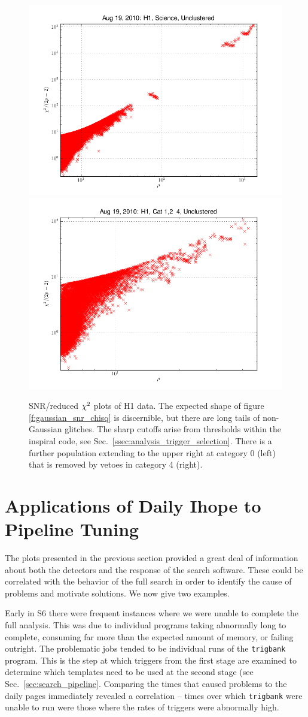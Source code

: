 \begin{figure}
  \includegraphics[width=0.5\linewidth]{figures/detchar/H1_0_UNCLUSTERED_chisq.png}
  \includegraphics[width=0.5\linewidth]{figures/detchar/H1_4_UNCLUSTERED_chisq.png}
  \caption[SNR/reduced $\chisq$ plots of H1 data.]{
  \label{f:daily_ihope_snr_chisq}
SNR/reduced $\chisq$ plots of H1 data.  The expected shape of figure
\ref{f:gaussian_snr_chisq} is discernible, but there are long tails of
non-Gaussian glitches.  The sharp cutoffs arise from thresholds within
the inspiral code, see Sec.~\ref{ssec:analysis_trigger_selection}.
There is a further population extending to the upper right at category
0 (left) that is removed by vetoes in category 4 (right).}
\end{figure}%


\section{Applications of Daily Ihope to Pipeline Tuning}
\label{sec:applications_pipeline}


The plots presented in the previous section provided a great deal of
information about both the detectors and the response of the search
software.  These could be correlated with the behavior of the full
search in order to identify the cause of problems and motivate
solutions.  We now give two examples.

Early in S6 there were frequent instances where we were unable to
complete the full analysis.  This was due to individual programs
taking abnormally long to complete, consuming far more than the
expected amount of memory, or failing outright.  The problematic jobs
tended to be individual runs of the \texttt{trigbank} program.  This
is the step at which triggers from the first stage are examined to
determine which templates need to be used at the second stage (see
Sec.~\ref{sec:search_pipeline}.  Comparing the times that caused
problems to the daily pages immediately revealed a correlation --
times over which \texttt{trigbank} were unable to run were those where
the rates of triggers were abnormally high.

